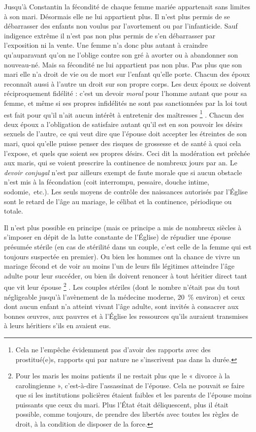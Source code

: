 Jusqu'à Constantin la fécondité de chaque femme mariée appartenait sans limites à son mari. Désormais elle ne lui appartient plus. Il n'est plus permis de se débarrasser des enfants non voulus par l'avortement ou par l'infanticide. Sauf indigence extrême il n'est pas non plus permis de s'en débarrasser par l'exposition ni la vente. Une femme n'a donc plus autant à craindre qu'auparavant qu'on ne l'oblige contre son gré à avorter ou à abandonner son nouveau-né. Mais sa fécondité ne lui appartient pas non plus. Pas plus que son mari elle n'a droit de vie ou de mort sur l'enfant qu'elle porte. Chacun des époux reconnaît aussi à l'autre un droit sur son propre corps. Les deux époux se doivent réciproquement fidélité : c'est un devoir \emph{moral} pour l'homme autant que pour sa femme, et même si ses propres infidélités ne sont pas sanctionnées par la loi tout est fait pour qu'il n'ait aucun intérêt à entretenir des maîtresses%
\footnote{Cela ne l'empêche évidemment pas d'avoir des rapports avec des prostitué(e)s, rapports qui par nature ne s'inscrivent pas dans la durée.}%
. Chacun des deux époux a l'obligation de satisfaire autant qu'il est en son pouvoir les désirs sexuels de l'autre, ce qui veut dire que l'épouse doit accepter les étreintes de son mari, quoi qu'elle puisse penser des risques de grossesse et de santé à quoi cela l'expose, et quels que soient ses propres désirs. Ceci dit la modération est prêchée aux maris, qui se voient prescrire la continence de nombreux jours par an. Le \emph{devoir conjugal} n'est par ailleurs exempt de faute morale que si aucun obstacle n'est mis à la fécondation (coit interrompu, pessaire, douche intime, sodomie,~etc.). Les seuls moyens de contrôle des naissances autorisés par l'Église sont le retard de l'âge au mariage, le célibat et la continence, périodique ou totale. 

 Il n'est plus possible en principe (mais ce principe a mis de nombreux siècles à s'imposer en dépit de la lutte constante de l'Église) de répudier une épouse présumée stérile (en cas de stérilité dans un couple, c'est celle de la femme qui est toujours suspectée en premier). Ou bien les hommes ont la chance de vivre un mariage fécond et de voir au moins l'un de leurs fils légitimes atteindre l'âge adulte pour leur succéder, ou bien ils doivent renoncer à tout héritier direct tant que vit leur épouse%
\footnote{Pour les maris les moins patients il ne restait plus que le « divorce à la carolingienne », c'est-à-dire l'assassinat de l'épouse. Cela ne pouvait se faire que si les institutions policières étaient faibles et les parents de l'épouse moins puissants que ceux du mari. Plus l'État était déliquescent, plus il était possible, comme toujours, de prendre des libertés avec toutes les règles de droit, à la condition de disposer de la force.}%
. Les couples stériles (dont le nombre n'était pas du tout négligeable jusqu'à l'avènement de la médecine moderne, 20~\% environ) et ceux dont aucun enfant n'a atteint vivant l'âge adulte, sont invités à consacrer aux bonnes œuvres, aux pauvres et à l'Église les ressources qu'ils auraient transmises à leurs héritiers s'ils en avaient eus.


